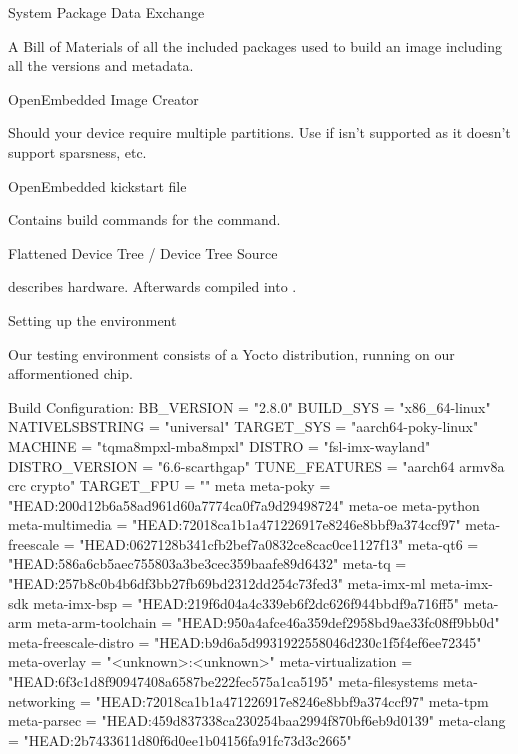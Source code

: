 \sec System Package Data Exchange 

A Bill of Materials of all the included
packages used to build an image including all the versions
and metadata.

\sec OpenEmbedded Image Creator 

Should your device require
multiple partitions.
Use if  isn't supported as it doesn't support
sparsness, etc.

\secc OpenEmbedded kickstart file 

Contains build commands for the  command.

\secc Flattened Device Tree  / Device Tree Source 

 describes hardware.
Afterwards compiled into .

\chap Setting up the environment

Our testing environment consists of a Yocto distribution,
running on our afformentioned chip.


\begtt
Build Configuration:
BB_VERSION           = "2.8.0"
BUILD_SYS            = "x86_64-linux"
NATIVELSBSTRING      = "universal"
TARGET_SYS           = "aarch64-poky-linux"
MACHINE              = "tqma8mpxl-mba8mpxl"
DISTRO               = "fsl-imx-wayland"
DISTRO_VERSION       = "6.6-scarthgap"
TUNE_FEATURES        = "aarch64 armv8a crc crypto"
TARGET_FPU           = ""
meta
meta-poky            = "HEAD:200d12b6a58ad961d60a7774ca0f7a9d29498724"
meta-oe
meta-python
meta-multimedia      = "HEAD:72018ca1b1a471226917e8246e8bbf9a374ccf97"
meta-freescale       = "HEAD:0627128b341cfb2bef7a0832ce8cac0ce1127f13"
meta-qt6             = "HEAD:586a6cb5aec755803a3be3cec359baafe89d6432"
meta-tq              = "HEAD:257b8c0b4b6df3bb27fb69bd2312dd254c73fed3"
meta-imx-ml
meta-imx-sdk
meta-imx-bsp         = "HEAD:219f6d04a4c339eb6f2dc626f944bbdf9a716ff5"
meta-arm
meta-arm-toolchain   = "HEAD:950a4afce46a359def2958bd9ae33fc08ff9bb0d"
meta-freescale-distro = "HEAD:b9d6a5d9931922558046d230c1f5f4ef6ee72345"
meta-overlay         = "<unknown>:<unknown>"
meta-virtualization  = "HEAD:6f3c1d8f90947408a6587be222fec575a1ca5195"
meta-filesystems
meta-networking      = "HEAD:72018ca1b1a471226917e8246e8bbf9a374ccf97"
meta-tpm
meta-parsec          = "HEAD:459d837338ca230254baa2994f870bf6eb9d0139"
meta-clang           = "HEAD:2b7433611d80f6d0ee1b04156fa91fc73d3c2665"
\endtt

